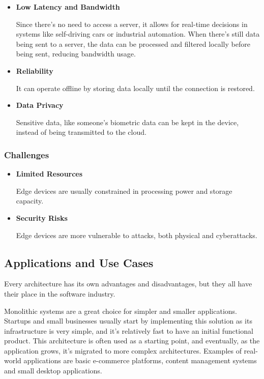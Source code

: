 \begin{itemize}


	\item \textbf{Low Latency and Bandwidth}

	      Since there's no need to access a server, it allows for real-time decisions
	      in systems like self-driving cars or industrial automation. When there's
	      still data being sent to a server, the data can be processed and filtered
	      locally before being sent, reducing bandwidth usage.


	\item \textbf{Reliability}

	      It can operate offline by storing data locally until the connection is
	      restored.

	\item \textbf{Data Privacy}

	      Sensitive data, like someone's biometric data can be kept in the device,
	      instead of being transmitted to the cloud.

\end{itemize}

\subsubsection{Challenges}
\begin{itemize}

	\item \textbf{Limited Resources}

	      Edge devices are usually constrained in processing power and storage capacity.

	\item \textbf{Security Risks}

	      Edge devices are more vulnerable to attacks, both physical and cyberattacks.

\end{itemize}

\subsection{Applications and Use Cases}
Every architecture has its own advantages and disadvantages, but they all have
their place in the software industry.

Monolithic systems are a great choice for simpler and smaller applications.
Startups and small businesses usually start by implementing this solution as
its infrastructure is very simple, and it's relatively fast to have an initial
functional product. This architecture is often used as a starting point, and
eventually, as the application grows, it's migrated to more complex architectures.
Examples of real-world applications are basic e-commerce platforms, content
management systems and small desktop applications.

